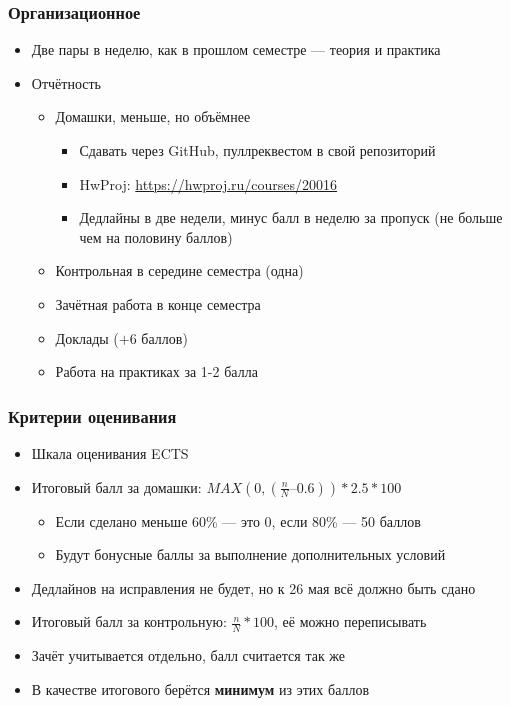 \documentclass{../../slides-style}
\begin{document}
    \begin{frame}
        \frametitle{Организационное}
        \begin{itemize}
            \item Две пары в неделю, как в прошлом семестре --- теория и практика
            \item Отчётность
            \begin{itemize}
                \item Домашки, меньше, но объёмнее
                \begin{itemize}
                    \item Сдавать через GitHub, пуллреквестом в свой репозиторий
                    \item HwProj: \url{https://hwproj.ru/courses/20016}
                    \item Дедлайны в две недели, минус балл в неделю за пропуск (не больше чем на половину баллов)
                \end{itemize}
                \item Контрольная в середине семестра (одна)
                \item Зачётная работа в конце семестра
                \item Доклады ($+6$ баллов)
                \item Работа на практиках за 1-2 балла
            \end{itemize}
        \end{itemize}
    \end{frame}

    \begin{frame}
        \frametitle{Критерии оценивания}
        \begin{itemize}
            \item Шкала оценивания ECTS
            \item Итоговый балл за домашки: $MAX(0, (\frac{n}{N} – 0.6)) * 2.5 * 100$
            \begin{itemize}
                \item Если сделано меньше 60\% --- это 0, если 80\% --- 50 баллов
                \item Будут бонусные баллы за выполнение дополнительных условий
            \end{itemize}
            \item Дедлайнов на исправления не будет, но к 26 мая всё должно быть сдано
            \item Итоговый балл за контрольную: $\frac{n}{N} * 100$, её можно переписывать
            \item Зачёт учитывается отдельно, балл считается так же
            \item В качестве итогового берётся \textbf{минимум} из этих баллов
        \end{itemize}
    \end{frame}
\end{document}
